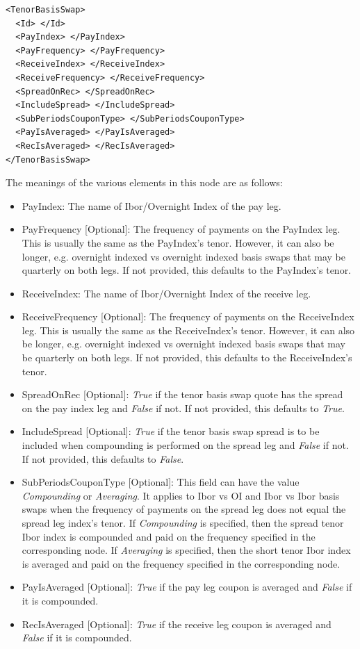 \begin{listing}[H]
\begin{verbatim}
<TenorBasisSwap>
  <Id> </Id>
  <PayIndex> </PayIndex>
  <PayFrequency> </PayFrequency>
  <ReceiveIndex> </ReceiveIndex>
  <ReceiveFrequency> </ReceiveFrequency>
  <SpreadOnRec> </SpreadOnRec>
  <IncludeSpread> </IncludeSpread>
  <SubPeriodsCouponType> </SubPeriodsCouponType>
  <PayIsAveraged> </PayIsAveraged>
  <RecIsAveraged> </RecIsAveraged>
</TenorBasisSwap>
\end{verbatim}
\caption{Tenor basis swap conventions}
\label{lst:tenor_basis_conventions}
\end{listing}


The meanings of the various elements in this node are as follows:
\begin{itemize}
\item PayIndex: The name of Ibor/Overnight Index of the pay leg.
\item PayFrequency [Optional]: The frequency of payments on the PayIndex leg. This is usually the same as the PayIndex's tenor.
However, it can also be longer, e.g. overnight indexed vs overnight indexed basis swaps that may be quarterly on both legs.
If not provided, this defaults to the PayIndex's tenor.
\item ReceiveIndex: The name of Ibor/Overnight Index of the receive leg.
\item ReceiveFrequency [Optional]: The frequency of payments on the ReceiveIndex leg. This is usually the same as the ReceiveIndex's tenor.
However, it can also be longer, e.g. overnight indexed vs overnight indexed basis swaps that may be quarterly on both legs.
If not provided, this defaults to the ReceiveIndex's tenor.
\item SpreadOnRec [Optional]: \emph{True}  if the tenor basis swap quote has the spread on the pay index leg and \emph{False} if not.
If not provided, this defaults to \emph{True}.
\item IncludeSpread [Optional]: \emph{True} if the tenor basis swap spread is to be included when compounding is performed on the spread leg and \emph{False} if not.
If not provided, this defaults to \emph{False}.
\item SubPeriodsCouponType [Optional]: This field can have the value \emph{Compounding} or \emph{Averaging}. It applies to Ibor vs OI and Ibor vs Ibor basis swaps when the frequency of payments on the spread leg does not equal the spread leg index’s tenor.
If \emph{Compounding} is specified, then the spread tenor Ibor index is compounded and paid on the frequency specified in the corresponding node.
If \emph{Averaging} is specified, then the short tenor Ibor index is averaged and paid on the frequency specified in the corresponding node.
\item PayIsAveraged [Optional]: \emph{True} if the pay leg coupon is averaged and \emph{False} if it is compounded.
\item RecIsAveraged [Optional]: \emph{True} if the receive leg coupon is averaged and \emph{False} if it is compounded.
\end{itemize}

